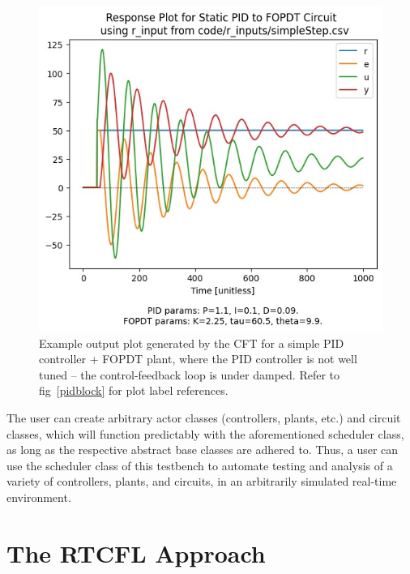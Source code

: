 \documentclass[10pt,twocolumn,letterpaper]{article}
\begin{document}
        \begin{figure}[h]
            \includegraphics[width=\linewidth]{./figures/output_plot_2022Apr25221020.jpg}
            \centering
            \caption{Example output plot generated by the CFT for a simple PID controller + FOPDT plant, where the PID
                controller is not well tuned -- the control-feedback loop is under damped. Refer to fig~\ref{pidblock}
                for plot label references.}
            \label{controllertboutputplot}
        \end{figure}

        The user can create arbitrary actor classes (controllers, plants, etc.) and circuit classes, which will function
        predictably with the aforementioned scheduler class, as long as the respective abstract base classes are adhered
        to. Thus, a user can use the scheduler class of this testbench to automate testing and analysis of a variety of
        controllers, plants, and circuits, in an arbitrarily simulated real-time environment.


    \section{The RTCFL Approach} \label{RTCFLexpained}
\end{document}
